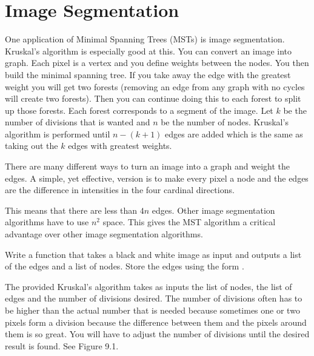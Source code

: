 
\label{Ch:MSTImgSeg}


\section*{Image Segmentation}


One application of Minimal Spanning Trees (MSTs) is image segmentation.
Kruskal's algorithm is especially good at this.
You can convert an image into graph. Each pixel is a vertex and you define weights between the nodes. You then build the minimal spanning tree. If you take away the edge with the greatest weight you will get two forests (removing an edge from any graph with no cycles will create two forests). Then you can continue doing this to each forest to split up those forests. Each forest corresponds to a segment of the image.
Let $k$ be the number of divisions that is wanted and $n$ be the number of nodes.
Kruskal's algorithm is performed until $n-(k+1)$ edges are added which is the same as taking out the $k$ edges with greatest weights.

There are many different ways to turn an image into a graph and weight the edges.
A simple, yet effective, version is to make every pixel a node and the edges are the difference in intensities in the four cardinal directions. 


This means that there are less than $4n$ edges.
Other image segmentation algorithms have to use $n^2$ space.
This gives the MST algorithm a critical advantage over other image segmentation algorithms. 

\begin{problem}
Write a function that takes a black and white image as input and outputs a list of the edges and a list of nodes.
Store the edges using the form .
\end{problem}

The provided Kruskal's algorithm takes as inputs the list of nodes, the list of edges and the number of divisions desired.
The number of divisions often has to be higher than the actual number that is needed because sometimes one or two pixels form a division because the difference between them and the pixels around them is so great.
You will have to adjust the number of divisions until the desired result is found.  See Figure 9.1.

